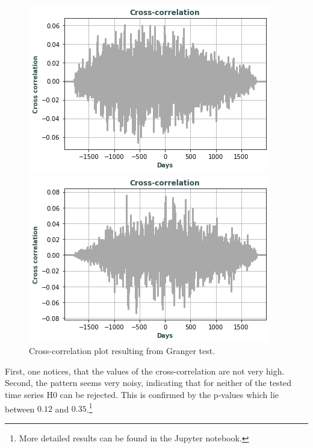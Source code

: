 \documentclass[11pt]{article}
\begin{document}
\begin{figure}[H]
\begin{minipage}[b]{0.5\textwidth}
    \includegraphics[width=\textwidth]{images/granger_btc_natgas.png}
    
  \end{minipage}
  \hfill
  \begin{minipage}[b]{0.5\textwidth}
    \includegraphics[width=\textwidth]{images/granger_crypto_liverC.png}
    
  \end{minipage}
  \caption{Cross-correlation plot resulting from Granger test.}
  \label{fig:granger_test}
\end{figure}


\noindent First, one notices, that the values of the cross-correlation are not very high. Second, the pattern seems very noisy, indicating that for neither of the tested time series H0 can be rejected. 
This is confirmed by the p-values which lie between $0.12$ and $0.35$.\footnote{More detailed results can be found in the Jupyter notebook.}
\end{document}
